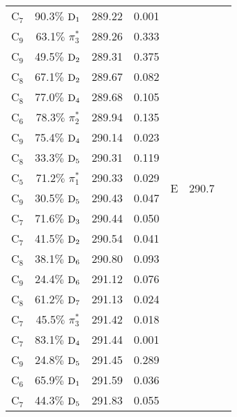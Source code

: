 \documentclass[12pt]{article}
\begin{document}
\begin{table}[!h]
\begin{tabular}{c@{\hskip 0.22in}c@{\hskip 0.22in}c@{\hskip 0.22in}c@{\hskip 0.52in}c@{\hskip 0.22in}c@{\hskip 0.22in}c}
    C$_7$
 &   90.3$\%$ $\rm D_1$  & 289.22 & 0.001 \\
    C$_9$
 &   63.1$\%$ $\pi_3^*$  & 289.26 & 0.333 \\
    C$_9$
 &   49.5$\%$ $\rm D_2$  & 289.31 & 0.375 
 \vspace{0.1in}\\
    C$_8$
 &   67.1$\%$ $\rm D_2$  & 289.67 & 0.082 \\
    C$_8$
 &   77.0$\%$ $\rm D_4$  & 289.68 & 0.105 \\
    C$_6$
 &   78.3$\%$ $\pi_2^*$  & 289.94 & 0.135 
 \vspace{0.1in}\\
    C$_9$
 &   75.4$\%$ $\rm D_4$  & 290.14 & 0.023 & \multirow{6}{*}{E} &  \multirow{6}{*}{290.7} \\
    C$_8$
 &   33.3$\%$ $\rm D_5$  & 290.31 & 0.119 \\
    C$_5$
 &   71.2$\%$ $\pi_1^*$  & 290.33 & 0.029 \\
    C$_9$
 &   30.5$\%$ $\rm D_5$  & 290.43 & 0.047 \\
    C$_7$
 &   71.6$\%$ $\rm D_3$  & 290.44 & 0.050 \\
    C$_7$
 &   41.5$\%$ $\rm D_2$  & 290.54 & 0.041 
 \vspace{0.1in}\\
    C$_8$
 &   38.1$\%$ $\rm D_6$  & 290.80 & 0.093 \\
    C$_9$
 &   24.4$\%$ $\rm D_6$  & 291.12 & 0.076 \\
    C$_8$
 &   61.2$\%$ $\rm D_7$  & 291.13 & 0.024 \\
    C$_7$
 &   45.5$\%$ $\pi_3^*$  & 291.42 & 0.018 \\
    C$_7$
 &   83.1$\%$ $\rm D_4$  & 291.44 & 0.001 \\
    C$_9$
 &   24.8$\%$ $\rm D_5$  & 291.45 & 0.289 \\
    C$_6$
 &   65.9$\%$ $\rm D_1$  & 291.59 & 0.036 \\
    C$_7$
 &   44.3$\%$ $\rm D_5$  & 291.83 & 0.055 \\
 \hline
 \hline
 \end{tabular}
   \label{table: thymine_k_carbon}
\end{table}
\newpage
\end{document}
